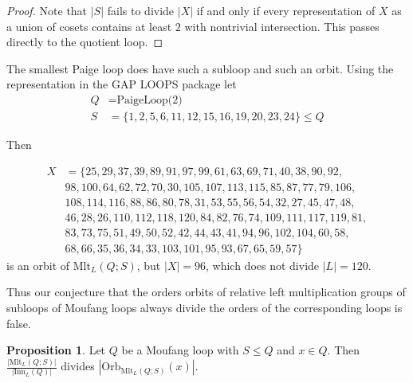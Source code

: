 \documentclass[12pt]{report}
\theoremstyle{definition}
\newtheorem{prp}[thm]{Proposition}
\newcommand{\mlt}{\text{Mlt}}       %
\newcommand{\inn}{\text{Inn}}       %
\newcommand{\orb}{\text{Orb}}		    %
\begin{document}
\begin{proof}
  Note that $|S|$ fails to divide $|X|$ if and only if every representation of $X$ as a union of cosets contains
    at least $2$ with nontrivial intersection. This passes directly to the quotient loop.
\end{proof}

The smallest Paige loop does have such a subloop and such an orbit. Using the representation in the
  GAP LOOPS package let
\begin{align*}
  Q &= \text{PaigeLoop(2)}\\
  S &= \{1, 2, 5, 6, 11, 12, 15, 16, 19, 20, 23, 24\} \leq Q
\end{align*}

Then

\begin{align*}
X &= \{25, 29, 37, 39, 89, 91, 97, 99, 61, 63, 69, 71, 40, 38, 90, 92,\\
  &98, 100, 64, 62, 72, 70, 30, 105, 107, 113, 115, 85, 87, 77, 79, 106,\\
  &108, 114, 116, 88, 86, 80, 78, 31, 53, 55, 56, 54, 32, 27, 45, 47, 48,\\
  &46, 28, 26, 110, 112, 118, 120, 84, 82, 76, 74, 109, 111, 117, 119, 81,\\
  &83, 73, 75, 51, 49, 50, 52, 42, 44, 43, 41, 94, 96, 102, 104, 60, 58,\\
  &68, 66, 35, 36, 34, 33, 103, 101, 95, 93, 67, 65, 59, 57\}
\end{align*}
is an orbit of $\mlt_L(Q; S)$, but $|X| = 96$, which does not divide $|L| = 120$.

Thus our conjecture that the orders orbits of relative left multiplication groups of subloops of Moufang loops always
  divide the orders of the corresponding loops is false. 

\begin{prp}
 Let $Q$ be a Moufang loop with $S\leq Q$ and $x\in Q$. Then $\frac{|\mlt_L(Q;S)|}{|\inn_L(Q)|}$
  divides $|\orb_{\mlt_L(Q;S)}(x)|$.
\end{prp}
\end{document}
